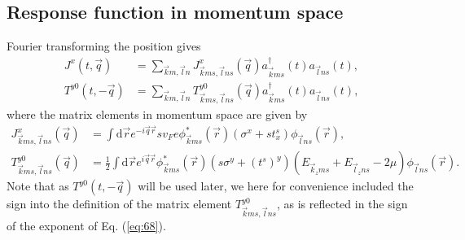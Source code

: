 \subsection{Response function in momentum space}
Fourier transforming the position gives
\begin{align}
  \label{eq:66}
  J^x(t, \vec{q}) &= \sum\limits_{\vec{k}m, \vec{l}n}
                    J^x_{\vec{k}ms, \vec{l}ns}(\vec{q})
                    a^{\dagger}_{\vec{k}ms}(t)
                    a_{\vec{l} ns}(t),\\
  \label{eq:67}
  T^{y 0}(t, -\vec{q}) &= \sum\limits_{\vec{k}m, \vec{l}n}^{}
                    T^{y 0}_{\vec{k}m s, \vec{l}n s}(\vec{q})
                    a^{\dagger}_{\vec{k}m s}(t)
                    a_{\vec{l} n s}(t),
\end{align}
where the matrix elements in momentum space are given by
\begin{align}
  J^x_{\vec{k}ms, \vec{l}ns}(\vec{q}) &=  \int \mathrm{d} \vec{r} e^{-i \vec{q} \vec{r}} s v_F e \phi ^{*}_{\vec{k}ms} (\vec{r}) (\sigma^x + s t^s_x) \phi _{\vec{l}ns}(\vec{r}),\\
  \label{eq:68}
  T^{y 0}_{\vec{k}m s, \vec{l} n s}(\vec{q}) &= \frac{1}{2}
                                                \int \mathrm{d}\vec{r} e^{i\vec{q}\vec{r}}
                                              \phi ^{*}_{\vec{k}m s}(\vec{r})
                                              (s \sigma ^y + (t^s)^y)
                                                (E_{\vec{k}_z m s} + E_{\vec{l}_z n  s} - 2 \mu ) \phi _{\vec{l} n  s}(\vec{r}).
\end{align}
Note that as $T^{y 0}(t, -\vec{q})$ will be used later, we here for convenience included the sign into the definition of the matrix element  $T^{y 0}_{\vec{k}ms, \vec{l}ns}$, as is reflected in the sign of the exponent of Eq. (\ref{eq:68}).


